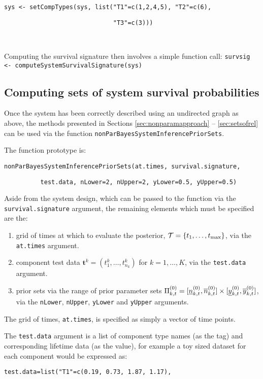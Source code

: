 \documentclass[12pt, a4paper]{elsarticle}
\newcommand{\bs}[1]{\boldsymbol{#1}}
\renewcommand{\vec}[1]{{\bs#1}}
\def\tmax{t_\text{max}}
\begin{document}
\noindent\texttt{sys <- setCompTypes(sys, list("T1"=c(1,2,4,5), "T2"=c(6),}

\noindent\texttt{~~~~~~~~~~~~~~~~~~~~~~~~~~~~~~"T3"=c(3)))}

\ 

Computing the survival signature then involves a simple function call:
\noindent\texttt{survsig <- computeSystemSurvivalSignature(sys)}

\subsection{Computing sets of system survival probabilities}

Once the system has been correctly described using an undirected graph
as above, the methods presented in Sections \ref{sec:nonparamapproach}
-- \ref{sec:setsofrel} can be used via the function
\texttt{nonParBayesSystemInferencePriorSets}.

The function prototype is:

\noindent\texttt{nonParBayesSystemInferencePriorSets(at.times, survival.signature,}

\noindent\texttt{~~~~~~~~~~test.data, nLower=2, nUpper=2, yLower=0.5, yUpper=0.5)}

Aside from the system design, which can be passed to the function via
the \texttt{survival.signature} argument, the remaining elements which
must be specified are the:
\begin{enumerate}
  \item grid of times at which to evaluate the posterior, ${\cal T} = \{t_1, \ldots, \tmax\}$, via the \texttt{at.times} argument.
  \item component test data $\vec{t}^k = (t^k_1, \ldots, t^k_{n_k})$ for $k=1,\dots,K$, via the \texttt{test.data} argument.
  \item prior sets via the range of prior parameter sets $\Pi^{(0)}_{k,t} = [\underline{n}^{(0)}_{k,t}, \overline{n}^{(0)}_{k,t}] \times [\underline{y}^{(0)}_{k,t}, \overline{y}^{(0)}_{k,t}]$, via the \texttt{nLower}, \texttt{nUpper}, \texttt{yLower} and \texttt{yUpper} arguments.
\end{enumerate}

The grid of times, \texttt{at.times}, is specified as simply a vector 
of time points.

The \texttt{test.data} argument is a list of component type names (as
the tag) and corresponding lifetime data (as the value), for example 
a toy sized dataset for each component would be expressed as:

\noindent\texttt{test.data=list("T1"=c(0.19, 0.73, 1.87, 1.17),}
\end{document}
